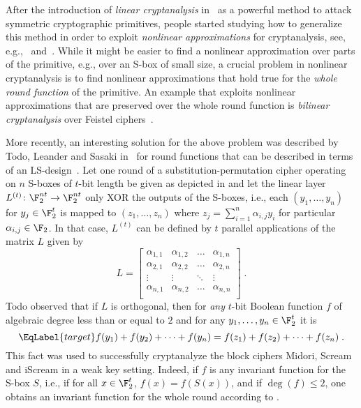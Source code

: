After the introduction of \emph{linear cryptanalysis} in~\cite{EC:Matsui93} as a powerful method to attack symmetric cryptographic primitives, people started studying how to generalize this method in order to exploit \emph{nonlinear approximations} for cryptanalysis, see, e.g.,~\cite{EC:HarKraMas95} and~\cite{EC:KnuRob96}. While it might be easier to find a nonlinear approximation over parts of the primitive, e.g., over an S-box of small size, a crucial problem in nonlinear cryptanalysis is to find nonlinear approximations that hold true for the \emph{whole round function} of the primitive. An example  that exploits nonlinear approximations that are preserved over the whole round function is \emph{bilinear cryptanalysis} over Feistel ciphers~\cite{C:Courtois04}.

More recently, an interesting solution for the above problem was described by Todo, Leander and Sasaki in~\cite{NonlinInv} for round functions that can be described in terms of an LS-design~\cite{FSE:GLSV14}.  Let one round of a substitution-permutation cipher operating on $n$ S-boxes of $t$-bit length be given as depicted in  and let the linear layer $L^{(t)} \colon \F_2^{nt} \rightarrow \F_2^{nt}$ only XOR the outputs of the S-boxes, i.e., each $(y_1,\dots,y_{n})$ for $y_j \in \F_2^t$ is mapped to $(z_1,\dots,z_{n})$ where $z_j = \sum_{i=1}^{n}\alpha_{i,j} y_i$ for particular $\alpha_{i,j} \in \F_2$. In that case, $L^{(t)}$ can be  defined by $t$ parallel applications of the matrix $L$ given by
\[L = \left[\begin{array}{cccc} \alpha_{1,1} & \alpha_{1,2} & \dots & \alpha_{1,n} \\
\alpha_{2,1} & \alpha_{2,2} & \dots& \alpha_{2,n} \\
\vdots & \vdots & \ddots& \vdots \\
\alpha_{n,1} & \alpha_{n,2} & \dots & \alpha_{n,n} \\
\end{array}\right]\;.\]
Todo \etal{} observed that if $L$ is orthogonal, then for \emph{any} $t$-bit Boolean function $f$ of algebraic degree less than or equal to $2$ and for any $y_1,\ldots,y_n \in \F_2^t$ it is 
\begin{equation}
\EqLabel{target}
    f(y_1) + f(y_2) + \dots + f(y_{n}) = f(z_1) + f(z_2) + \dots + f(z_{n})\;.
\end{equation}
This fact was used to successfully cryptanalyze the block ciphers Midori, Scream and iScream in a weak key setting. Indeed, if $f$ is any invariant function for the S-box $S$, i.e., if for all $x \in \F_2^t$, $f(x) = f(S(x))$, and if $\deg(f) \leq 2$, one obtains an invariant function for the whole round according to .

